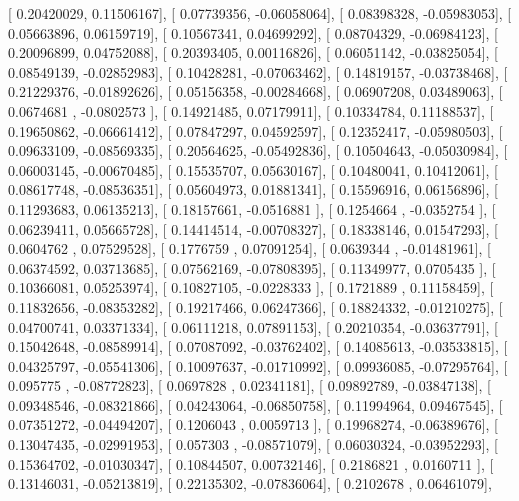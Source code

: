 \documentclass{article}
\begin{document}
       [ 0.20420029,  0.11506167],
       [ 0.07739356, -0.06058064],
       [ 0.08398328, -0.05983053],
       [ 0.05663896,  0.06159719],
       [ 0.10567341,  0.04699292],
       [ 0.08704329, -0.06984123],
       [ 0.20096899,  0.04752088],
       [ 0.20393405,  0.00116826],
       [ 0.06051142, -0.03825054],
       [ 0.08549139, -0.02852983],
       [ 0.10428281, -0.07063462],
       [ 0.14819157, -0.03738468],
       [ 0.21229376, -0.01892626],
       [ 0.05156358, -0.00284668],
       [ 0.06907208,  0.03489063],
       [ 0.0674681 , -0.0802573 ],
       [ 0.14921485,  0.07179911],
       [ 0.10334784,  0.11188537],
       [ 0.19650862, -0.06661412],
       [ 0.07847297,  0.04592597],
       [ 0.12352417, -0.05980503],
       [ 0.09633109, -0.08569335],
       [ 0.20564625, -0.05492836],
       [ 0.10504643, -0.05030984],
       [ 0.06003145, -0.00670485],
       [ 0.15535707,  0.05630167],
       [ 0.10480041,  0.10412061],
       [ 0.08617748, -0.08536351],
       [ 0.05604973,  0.01881341],
       [ 0.15596916,  0.06156896],
       [ 0.11293683,  0.06135213],
       [ 0.18157661, -0.0516881 ],
       [ 0.1254664 , -0.0352754 ],
       [ 0.06239411,  0.05665728],
       [ 0.14414514, -0.00708327],
       [ 0.18338146,  0.01547293],
       [ 0.0604762 ,  0.07529528],
       [ 0.1776759 ,  0.07091254],
       [ 0.0639344 , -0.01481961],
       [ 0.06374592,  0.03713685],
       [ 0.07562169, -0.07808395],
       [ 0.11349977,  0.0705435 ],
       [ 0.10366081,  0.05253974],
       [ 0.10827105, -0.0228333 ],
       [ 0.1721889 ,  0.11158459],
       [ 0.11832656, -0.08353282],
       [ 0.19217466,  0.06247366],
       [ 0.18824332, -0.01210275],
       [ 0.04700741,  0.03371334],
       [ 0.06111218,  0.07891153],
       [ 0.20210354, -0.03637791],
       [ 0.15042648, -0.08589914],
       [ 0.07087092, -0.03762402],
       [ 0.14085613, -0.03533815],
       [ 0.04325797, -0.05541306],
       [ 0.10097637, -0.01710992],
       [ 0.09936085, -0.07295764],
       [ 0.095775  , -0.08772823],
       [ 0.0697828 ,  0.02341181],
       [ 0.09892789, -0.03847138],
       [ 0.09348546, -0.08321866],
       [ 0.04243064, -0.06850758],
       [ 0.11994964,  0.09467545],
       [ 0.07351272, -0.04494207],
       [ 0.1206043 ,  0.0059713 ],
       [ 0.19968274, -0.06389676],
       [ 0.13047435, -0.02991953],
       [ 0.057303  , -0.08571079],
       [ 0.06030324, -0.03952293],
       [ 0.15364702, -0.01030347],
       [ 0.10844507,  0.00732146],
       [ 0.2186821 ,  0.0160711 ],
       [ 0.13146031, -0.05213819],
       [ 0.22135302, -0.07836064],
       [ 0.2102678 ,  0.06461079],
\end{document}
